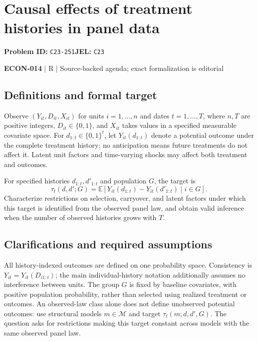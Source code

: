 \documentclass[11pt,a4paper]{article}
\begin{document}
\section*{Causal effects of treatment histories in panel data}
\textbf{Problem ID:} \texttt{C23-251}\quad \textbf{JEL:} \texttt{C23}\par
\label{problem:OP-0599}


\label{audited:ECON-014}

{\sffamily\small\color{muted}\textbf{ECON-014} | R | Source-backed agenda; exact formalization is editorial\par}

\subsection*{Definitions and formal target}

Observe $(Y_{it},D_{it},X_{it})$ for units $i=1,\ldots,n$ and dates $t=1,\ldots,T$, where $n,T$ are positive integers, $D_{it}\in\{0,1\}$, and $X_{it}$ takes values in a specified measurable covariate space. For $d_{1:t}\in\{0,1\}^t$, let $Y_{it}(d_{1:t})$ denote a potential outcome under the complete treatment history; no anticipation means future treatments do not affect it. Latent unit factors and time-varying shocks may affect both treatment and outcomes.

For specified histories $d_{1:t},d'_{1:t}$ and population $G$, the target is
\[
 \tau_t(d,d';G)=\mathbb E[Y_{it}(d_{1:t})-Y_{it}(d'_{1:t})\mid i\in G].
\]
Characterize restrictions on selection, carryover, and latent factors under which this target is identified from the observed panel law, and obtain valid inference when the number of observed histories grows with $T$.

\subsection*{Clarifications and required assumptions}

All history-indexed outcomes are defined on one probability space. Consistency is $Y_{it}=Y_{it}(D_{i1:t})$; the main individual-history notation additionally assumes no interference between units. The group $G$ is fixed by baseline covariates, with positive population probability, rather than selected using realized treatment or outcomes. An observed-law class alone does not define unobserved potential outcomes: use structural models $m\in\mathcal M$ and target $\tau_t(m;d,d',G)$. The question asks for restrictions making this target constant across models with the same observed panel law.
\end{document}
